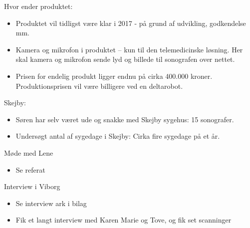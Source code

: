 Hvor ender produktet:
\begin{itemize}
\item Produktet vil tidligst være klar i 2017 - på grund af udvikling, godkendelse mm. 
\item Kamera og mikrofon i produktet – kun til den telemedicinske løsning. Her skal kamera og mikrofon sende lyd og billede til sonografen over nettet. 
\item Prisen for endelig produkt ligger endnu på cirka 400.000 kroner. Produktionsprisen vil være billigere ved en deltarobot. 
\end{itemize}
Skejby:
\begin{itemize}
\item Søren har selv været ude og snakke med Skejby sygehus: 15 sonografer. 
\item Undersøgt antal af sygedage i Skejby: Cirka fire sygedage på et år.  
\end{itemize}
Møde med Lene
\begin{itemize}
\item Se referat
\end{itemize}
Interview i Viborg
\begin{itemize}
\item Se interview ark i bilag
\item Fik et langt interview med Karen Marie og Tove, og fik set scanninger
\end{itemize}
\newpage